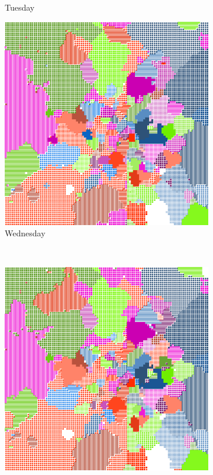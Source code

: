 \documentclass[12pt,a4paper]{article}
\begin{document}
\begin{figure}[H]
\begin{subfigure}[b]{0.35\textwidth}
\caption{Tuesday}
\end{subfigure}
\begin{subfigure}[b]{0.35\textwidth}
\includegraphics[width=\textwidth]{weekDef/3Wed.png}
\caption{Wednesday}
\end{subfigure}
\\
\begin{subfigure}[b]{0.35\textwidth}
\includegraphics[width=\textwidth]{weekDef/4Thu.png}

\end{subfigure}
\end{figure}
\end{document}
